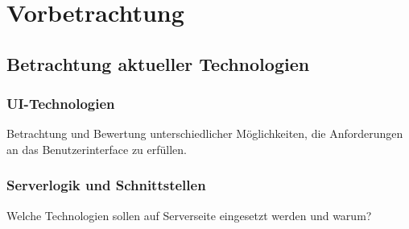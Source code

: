 \section{Vorbetrachtung}
\subsection{Betrachtung aktueller Technologien}

\subsubsection{UI-Technologien}

Betrachtung und Bewertung unterschiedlicher Möglichkeiten, die Anforderungen an das Benutzerinterface zu erfüllen.

\subsubsection{Serverlogik und Schnittstellen}

Welche Technologien sollen auf Serverseite eingesetzt werden und warum?